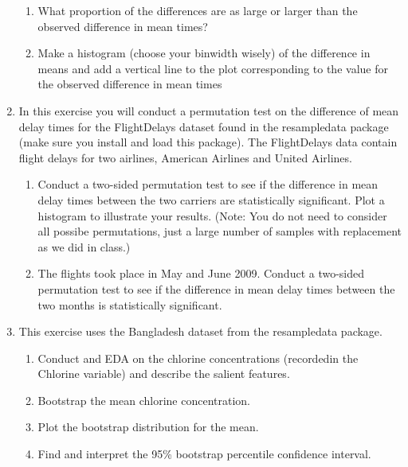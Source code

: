 \documentclass[12pt]{article}\usepackage[]{graphicx}\usepackage[]{color}
\begin{document}
\begin{enumerate}
\begin{enumerate}
    \item What proportion of the differences are as large or larger than the observed difference in mean times? 
    \item Make a histogram (choose your binwidth wisely) of the difference in means and add a vertical line to the plot corresponding to the value for the observed difference in mean times  
    \end{enumerate}
    
    \item In this exercise you will conduct a permutation test on the difference of mean delay times for the FlightDelays dataset found in the resampledata package (make sure you install and load this package).  The FlightDelays data contain flight delays for two airlines, American Airlines and United Airlines. 
    \begin{enumerate}
      \item Conduct a two-sided permutation test to see if the difference in mean delay times between the two carriers are statistically significant. Plot a histogram to illustrate your results. (Note: You do not need to consider all possibe permutations, just a large number of samples with replacement as we did in class.) 
     \item The flights took place in May and June 2009. Conduct a two-sided permutation test to see if the difference in mean delay times between the two months is statistically significant. 
    \end{enumerate}
    
    \item This exercise uses the Bangladesh dataset from the resampledata package. 
    \begin{enumerate}
      \item Conduct and EDA on the chlorine concentrations (recordedin the Chlorine variable) and describe the salient features. 
      \item Bootstrap the mean chlorine concentration. 
      \item Plot the bootstrap distribution for the mean. 
      \item Find and interpret the 95\% bootstrap percentile confidence interval. 
    \end{enumerate}
    

\end{enumerate}
\end{document}
